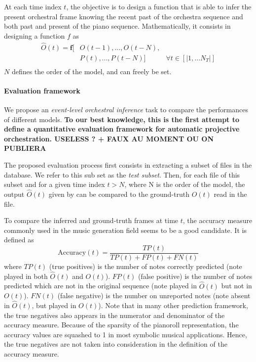 \documentclass[twoside,twocolumn]{article}
\begin{document}
At each time index $t$, the objective is to design a function that is able to infer the present orchestral frame knowing the recent past of the orchestra sequence and both past and present of the piano sequence. Mathematically, it consists in designing a function $f$ as
\begin{equation}
\begin{aligned}
\hat{O}(t) = \bm{f}\lbrack & O(t-1), ..., O(t-N), & \\
	& P(t), ... ,P(t-N) \rbrack & \forall t \in \left\lbrack|1, ... N_{T}|\right\rbrack\\
\end{aligned}
\label{eq:inference_function}
\end{equation}
$N$ defines the order of the model, and can freely be set.

\paragraph{Evaluation framework}
We propose an \textit{event-level orchestral inference} task to compare the performances of different models. \textbf{To our best knowledge, this is the first attempt to define a quantitative evaluation framework for automatic projective orchestration. USELESS ? + FAUX AU MOMENT OU ON PUBLIERA}

The proposed evaluation process first consists in extracting a subset of files in the database. We refer to this sub set as the \textit{test subset}. Then, for each file of this subset and for a given time index $t > N$, where N is the order of the model, the output $\hat{O}(t)$ given by  can be compared to the ground-truth $O(t)$ read in the file.

To compare the inferred and ground-truth frames at time $t$, the accuracy measure commonly used in the music generation field \cite{DBLP:journals/corr/YaoCVDD15,boulanger2012modeling,lavrenko2003polyphonic} seems to be a good candidate. It is defined as
\begin{equation}
\text{Accuracy}(t)  = \frac{TP(t)}{TP(t) + FP(t) + FN(t)}
\label{eq:accuracy}
\end{equation}
where $TP(t)$ (true positives) is the number of notes correctly predicted (note played in both $\hat{O}(t)$ and $O(t)$). $FP(t)$ (false positive) is the number of notes predicted which are not in the original sequence (note played in $\hat{O}(t)$ but not in $O(t)$). $FN(t)$ (false negative) is the number on unreported notes (note absent in $\hat{O}(t)$, but played in $O(t)$). 
Note that in many other prediction framework, the true negatives also appears in the numerator and denominator of the accuracy measure. Because of the sparsity of the pianoroll representation, the accuracy values are squashed to 1 in most symbolic musical applications. Hence, the true negatives are not taken into consideration in the definition of the accuracy measure.
\end{document}
